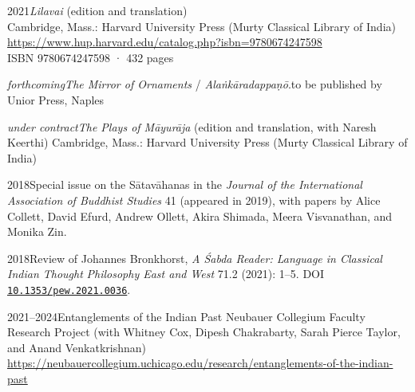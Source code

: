 \documentclass{scrartcl}
\begin{document}
\begin{entrylist}
\singleentry
{2021}{\emph{Lilavai} (edition and translation)\\
Cambridge, Mass.: Harvard University Press (Murty Classical Library of India)\\
\url{https://www.hup.harvard.edu/catalog.php?isbn=9780674247598}\\
ISBN 9780674247598 · 432 pages}
\end{entrylist}

\begin{entrylist}
{\emph{forthcoming}}{\emph{The Mirror of Ornaments} / \emph{Alaṅkāradappaṇō}.}{to be published by Unior Press, Naples}
\end{entrylist}

\begin{entrylist}
{\emph{under contract}}{\emph{The Plays of Māyurāja} (edition and translation, with Naresh Keerthi)}
{Cambridge, Mass.: Harvard University Press (Murty Classical Library of India)}
\end{entrylist}

\sectionline

\begin{entrylist}
\singleentry
{2018}{Special issue on the Sātavāhanas in the \emph{Journal of the International Association of Buddhist Studies} 41 (appeared in 2019), with papers by Alice Collett, David Efurd, Andrew Ollett, Akira Shimada, Meera Visvanathan, and Monika Zin.}
\end{entrylist}

\begin{entrylist}
{2018}{Review of Johannes Bronkhorst, \emph{A Śabda Reader: Language in Classical Indian Thought}}
{\emph{Philosophy East and West} 71.2 (2021): 1–5. DOI \href{https://doi.org/10.1353/pew.2021.0036}{\texttt{10.1353/pew.2021.0036}}.}
\end{entrylist}

\sectionline


\begin{entrylist}
{2021–2024}{Entanglements of the Indian Past}
{Neubauer Collegium Faculty Research Project (with Whitney Cox, Dipesh Chakrabarty, Sarah Pierce Taylor, and Anand Venkatkrishnan)\\
\url{https://neubauercollegium.uchicago.edu/research/entanglements-of-the-indian-past}}
\end{entrylist} 
\end{document}
